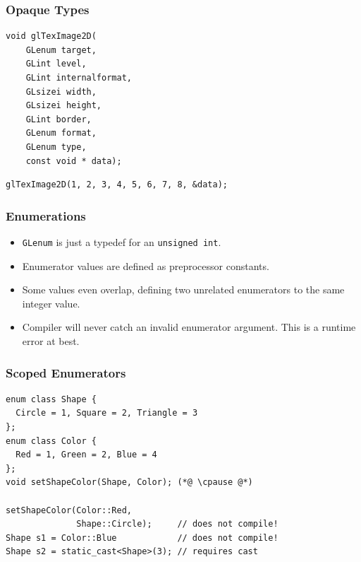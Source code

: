 \documentclass[aspectratio=169]{beamer}
\newif\iftransitions
\newcommand{\cpause}{\iftransitions \pause \fi}
\begin{document}
\begin{frame}[fragile]
  \frametitle{Opaque Types}
  
  \begin{lstlisting}[style=cpp20]
  void glTexImage2D(
    GLenum target,
    GLint level,
    GLint internalformat,
    GLsizei width,
    GLsizei height,
    GLint border,
    GLenum format,
    GLenum type,
    const void * data);
  \end{lstlisting}
  
  \cpause
  \begin{lstlisting}[style=cpp20]
  glTexImage2D(1, 2, 3, 4, 5, 6, 7, 8, &data);
  \end{lstlisting}
  

\end{frame}

\begin{frame}

  \frametitle{Enumerations}

  \begin{itemize}
    \item \texttt{GLenum} is just a typedef for an \texttt{unsigned int}. \cpause
    \item Enumerator values are defined as preprocessor constants. \cpause
    \item Some values even overlap, defining two unrelated enumerators to the same integer value. \cpause
    \item Compiler will never catch an invalid enumerator argument. This is a runtime error at best.
  \end{itemize}

\end{frame}

\begin{frame}[fragile]
  \frametitle{Scoped Enumerators}
  
  \begin{lstlisting}[style=cpp20]
enum class Shape {
  Circle = 1, Square = 2, Triangle = 3
};
enum class Color {
  Red = 1, Green = 2, Blue = 4
};
void setShapeColor(Shape, Color); (*@ \cpause @*)

setShapeColor(Color::Red,
              Shape::Circle);     // does not compile!
Shape s1 = Color::Blue            // does not compile!
Shape s2 = static_cast<Shape>(3); // requires cast
  \end{lstlisting}
\end{frame}
\end{document}
